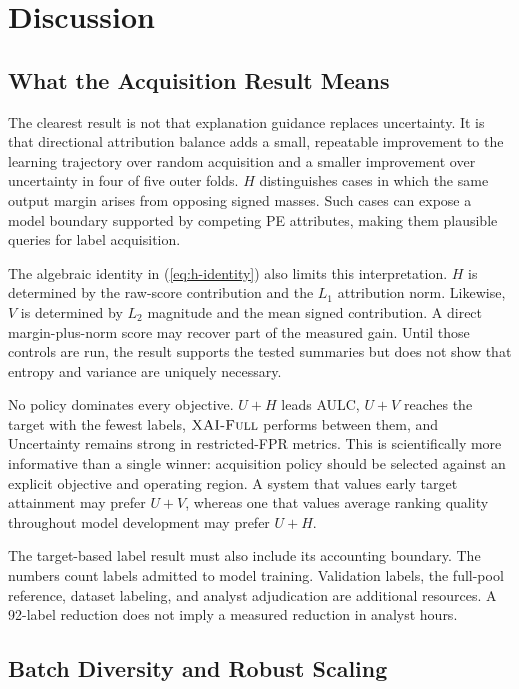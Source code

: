 \section{Discussion}
\label{sec:discussion}

\subsection{What the Acquisition Result Means}

The clearest result is not that explanation guidance replaces uncertainty. It is
that directional attribution balance adds a small, repeatable improvement to the
learning trajectory over random acquisition and a smaller improvement over
uncertainty in four of five outer folds. $H$ distinguishes cases in which the
same output margin arises from opposing signed masses. Such cases can expose a
model boundary supported by competing PE attributes, making them plausible
queries for label acquisition.

The algebraic identity in (\ref{eq:h-identity}) also limits this interpretation.
$H$ is determined by the raw-score contribution and the $L_1$ attribution norm.
Likewise, $V$ is determined by $L_2$ magnitude and the mean signed contribution.
A direct margin-plus-norm score may recover part of the measured gain. Until
those controls are run, the result supports the tested summaries but does not
show that entropy and variance are uniquely necessary.

No policy dominates every objective. $U+H$ leads AULC, $U+V$ reaches the target
with the fewest labels, $\textsc{XAI-Full}$ performs between them, and Uncertainty remains
strong in restricted-FPR metrics. This is scientifically more informative than a
single winner: acquisition policy should be selected against an explicit
objective and operating region. A system that values early target attainment may
prefer $U+V$, whereas one that values average ranking quality throughout model
development may prefer $U+H$.

The target-based label result must also include its accounting boundary. The
numbers count labels admitted to model training. Validation labels, the full-pool
reference, dataset labeling, and analyst adjudication are additional resources.
A 92-label reduction does not imply a measured reduction in analyst hours.

\subsection{Batch Diversity and Robust Scaling}

